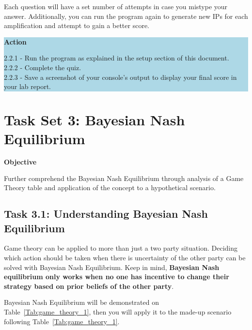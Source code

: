 \documentclass[letterpaper,12pt]{report}
\begin{document}
Each question will have a set number of attempts in case you mistype your answer. Additionally, you can run the program again to generate new IPs for each amplification and attempt to gain a better score.

\colorbox{lightblue}{%
\parbox{\dimexpr\linewidth-2\fboxsep}{%
\textbf{Action}

2.2.1 - Run the program as explained in the setup section of this document.\\ 
2.2.2 - Complete the quiz.\\
2.2.3 - Save a screenshot of your console's output to display your final score in your lab report.\\ 
    }%
}%


\section*{Task Set 3: Bayesian Nash Equilibrium }\label{sec:Task-Set-3}

\textbf{Objective}

Further comprehend the Bayesian Nash Equilibrium through analysis of a Game Theory table and application of the concept to a hypothetical scenario.

\subsection*{Task 3.1: Understanding Bayesian Nash Equilibrium}\label{sec:Task-3.1-Understanding-Bayesian-Nash-Equilibrium}

Game theory can be applied to more than just a two party situation. Deciding which action should be taken when there is uncertainty of the other party can be solved with Bayesian Nash Equilibrium. Keep in mind, \textbf{Bayesian Nash equilibrium only works when no one has incentive to change their strategy based on prior beliefs of the other party}.

\bigskip

Bayesian Nash Equilibrium will be demonstrated on Table~\ref{Tab:game_theory_1}, then you will apply it to the made-up scenario following Table~\ref{Tab:game_theory_1}.
\end{document}
